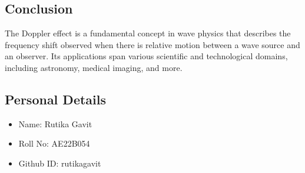 \documentclass{article}
\begin{document}
\subsection*{Conclusion}
The Doppler effect is a fundamental concept in wave physics that describes the frequency shift observed when there is relative motion between a wave source and an observer. Its applications span various scientific and technological domains, including astronomy, medical imaging, and more.

\subsection*{Personal Details}
\begin{itemize}
    \item Name: Rutika Gavit 
    \item Roll No: AE22B054 
    \item Github ID: rutikagavit
\end{itemize}



\end{document}

